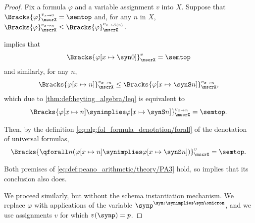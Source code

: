 \begin{proof}
   Fix a formula \( \varphi \) and a variable assignment \( v \) into \( X \). Suppose that \( \Bracks{\varphi}_\mscrX^{v_{x \to 0}} = \semtop \) and, for any \( n \) in \( X \), \( \Bracks{\varphi}_\mscrX^{v_{x \to n}} \leq \Bracks{\varphi}_\mscrX^{v_{x \to S(n)}} \).

   implies that
  \begin{equation*}
    \Bracks{\varphi[x \mapsto \syn0]}_\mscrX^v = \semtop
  \end{equation*}
  and similarly, for any \( n \),
  \begin{equation*}
    \Bracks{\varphi[x \mapsto n]}_\mscrX^{v_{x \to n}} \leq \Bracks{\varphi[x \mapsto \synS n]}_\mscrX^{v_{x \to n}},
  \end{equation*}
  which due to \cref{thm:def:heyting_algebra/leq} is equivalent to
  \begin{equation*}
    \Bracks{\varphi[x \mapsto n] \synimplies \varphi[x \mapsto \synS n]}_\mscrX^{v_{x \to n}} = \semtop.
  \end{equation*}

  Then, by the definition \eqref{eq:alg:fol_formula_denotation/forall} of the denotation of universal formulas,
  \begin{equation*}
    \Bracks{\qforall n (\varphi[x \mapsto n] \synimplies \varphi[x \mapsto \synS n])}_\mscrX^v = \semtop.
  \end{equation*}

  Both premises of \eqref{eq:def:peano_arithmetic/theory/PA3} hold, so  implies that its conclusion also does.

   We proceed similarly, but without the schema instantiation mechanism. We replace \( \varphi \) with applications of the variable \( \synp^{\syn\iota \synimplies \syn\omicron} \), and we use assignments \( v \) for which \( v(\synp) = p \).
\end{proof}


